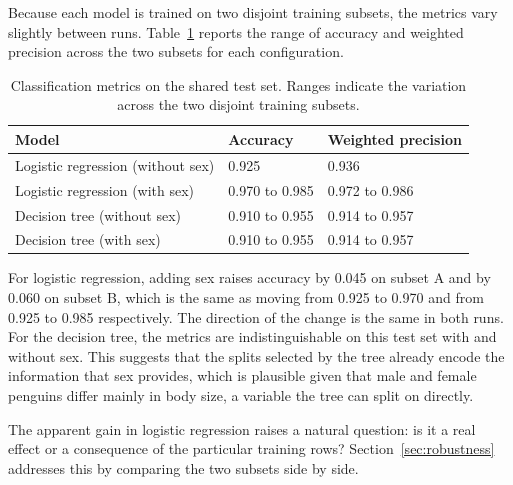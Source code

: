 Because each model is trained on two disjoint training subsets, the metrics vary slightly between runs. Table~\ref{tab:cls_metrics} reports the range of accuracy and weighted precision across the two subsets for each configuration.

\begin{table}[htbp]
	\centering
	\caption{Classification metrics on the shared test set. Ranges indicate the variation across the two disjoint training subsets.}
	\label{tab:cls_metrics}
	\begin{tabular}{lll}
		\toprule
		Model & Accuracy & Weighted precision \\
		\midrule
		Logistic regression (without sex) & 0.925 & 0.936 \\
		Logistic regression (with sex)    & 0.970 to 0.985 & 0.972 to 0.986 \\
		Decision tree (without sex)       & 0.910 to 0.955 & 0.914 to 0.957 \\
		Decision tree (with sex)          & 0.910 to 0.955 & 0.914 to 0.957 \\
		\bottomrule
	\end{tabular}
\end{table}

For logistic regression, adding sex raises accuracy by 0.045 on subset A and by 0.060 on subset B, which is the same as moving from 0.925 to 0.970 and from 0.925 to 0.985 respectively. The direction of the change is the same in both runs. For the decision tree, the metrics are indistinguishable on this test set with and without sex. This suggests that the splits selected by the tree already encode the information that sex provides, which is plausible given that male and female penguins differ mainly in body size, a variable the tree can split on directly.

The apparent gain in logistic regression raises a natural question: is it a real effect or a consequence of the particular training rows? Section~\ref{sec:robustness} addresses this by comparing the two subsets side by side.